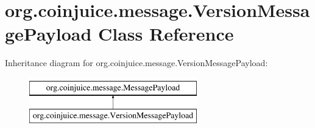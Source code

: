 \hypertarget{classorg_1_1coinjuice_1_1message_1_1_version_message_payload}{\section{org.\-coinjuice.\-message.\-Version\-Message\-Payload Class Reference}
\label{classorg_1_1coinjuice_1_1message_1_1_version_message_payload}
}
Inheritance diagram for org.\-coinjuice.\-message.\-Version\-Message\-Payload\-:\begin{figure}[H]
\begin{center}
\leavevmode
\includegraphics[height=2.000000cm]{classorg_1_1coinjuice_1_1message_1_1_version_message_payload}
\end{center}
\end{figure}

